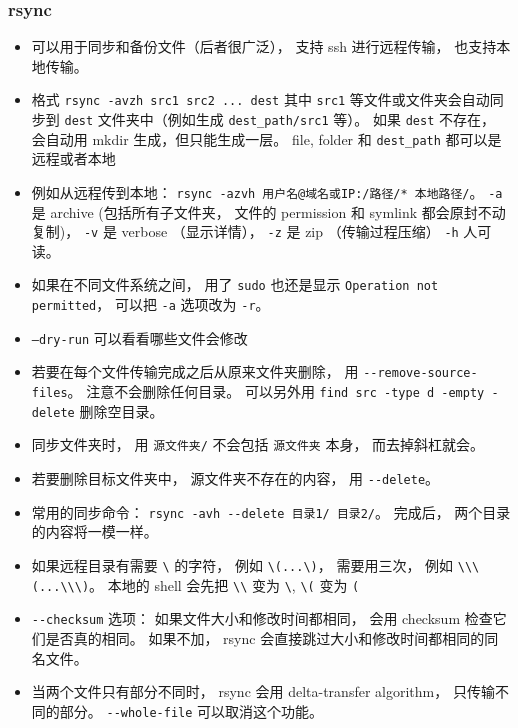 \subsubsection{rsync}
\begin{itemize}
\item 可以用于同步和备份文件（后者很广泛）， 支持 ssh 进行远程传输， 也支持本地传输。
\item 格式 \verb`rsync -avzh src1 src2 ... dest` 其中 \verb|src1| 等文件或文件夹会自动同步到 \verb|dest| 文件夹中（例如生成 \verb`dest_path/src1` 等）。 如果 \verb|dest| 不存在， 会自动用 mkdir 生成，但只能生成一层。 file, folder 和 \verb|dest_path| 都可以是远程或者本地
\item 例如从远程传到本地： \verb|rsync -azvh 用户名@域名或IP:/路径/* 本地路径/|。 \verb`-a` 是 archive (包括所有子文件夹， 文件的 permission 和 symlink 都会原封不动复制)， \verb`-v` 是 verbose （显示详情）， \verb`-z` 是 zip （传输过程压缩） \verb`-h` 人可读。
\item 如果在不同文件系统之间， 用了 \verb|sudo| 也还是显示 \verb|Operation not permitted|， 可以把 \verb|-a| 选项改为 \verb|-r|。
\item \verb|–dry-run| 可以看看哪些文件会修改
\item 若要在每个文件传输完成之后从原来文件夹删除， 用 \verb`--remove-source-files`。 注意不会删除任何目录。 可以另外用 \verb|find src -type d -empty -delete| 删除空目录。
\item 同步文件夹时， 用 \verb|源文件夹/| 不会包括 \verb|源文件夹| 本身， 而去掉斜杠就会。
\item 若要删除目标文件夹中， 源文件夹不存在的内容， 用 \verb`--delete`。
\item 常用的同步命令： \verb|rsync -avh --delete 目录1/ 目录2/|。 完成后， 两个目录的内容将一模一样。
\item 如果远程目录有需要 \verb`\` 的字符， 例如 \verb`\(...\)`， 需要用三次， 例如 \verb`\\\(...\\\)`。 本地的 shell 会先把 \verb`\\` 变为 \verb`\`, \verb`\(` 变为 \verb`(`
\item \verb|--checksum| 选项： 如果文件大小和修改时间都相同， 会用 checksum 检查它们是否真的相同。 如果不加， rsync 会直接跳过大小和修改时间都相同的同名文件。
\item 当两个文件只有部分不同时， rsync 会用 delta-transfer algorithm， 只传输不同的部分。 \verb|--whole-file| 可以取消这个功能。
\end{itemize}


